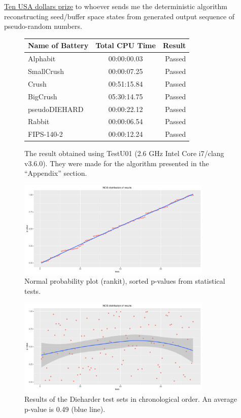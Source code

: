 \documentclass[twocolumn, a4paper, 10pt]{article}
\begin{document}
\underline{Ten USA dollars prize} to whoever sends me the deterministic algorithm reconstructing seed/buffer space states from generated output sequence of pseudo-random numbers.

\begin{figure}[ht]
  \centering
  \begin{tabular}{lcr}
    Name of Battery & Total CPU Time & Result \\
    \hline
    Alphabit      & 00:00:00.03 & Passed \\
    SmallCrush    & 00:00:07.25 & Passed \\
    Crush         & 00:51:15.84 & Passed \\
    BigCrush      & 05:30:14.75 & Passed \\
    pseudoDIEHARD & 00:00:22.12 & Passed \\
    Rabbit        & 00:00:06.54 & Passed \\
    FIPS-140-2    & 00:00:12.24 & Passed
  \end{tabular}
  \caption{The result obtained using TestU01 (2.6 GHz Intel Core i7/clang v3.6.0). They were made for the algorithm presented in the ``Appendix'' section.}
  \label{result-tests}
\end{figure}

\begin{figure}[ht]
  \centering
  \includegraphics[width=9.25cm]{ncg-distribution-rankit}
  \caption{Normal probability plot (rankit), sorted p-values from statistical tests.}
  \label{result-rankit}
\end{figure}

\begin{figure}[ht]
  \centering
  \includegraphics[width=9.25cm]{ncg-distribution-normal}
  \caption{Results of the Dieharder test sets in chronological order. An average p-value is 0.49 (blue line).}
  \label{result-normal}
\end{figure}
\end{document}
